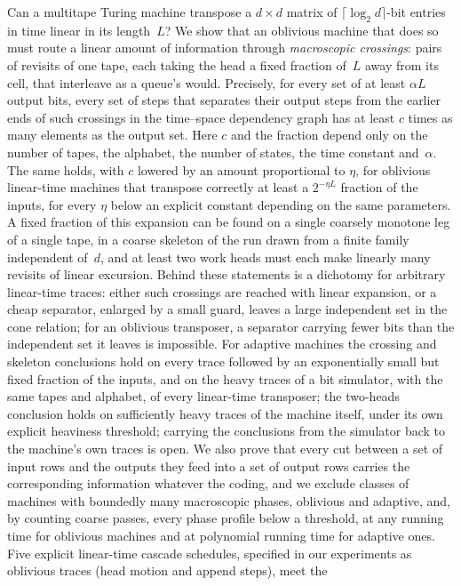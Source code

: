 Can a multitape Turing machine transpose a $d\times d$ matrix of $\lceil\log_2 d\rceil$-bit entries in time linear in its
length~$L$? We show that an oblivious machine that does so must route a linear amount of information through
\emph{macroscopic crossings}: pairs of revisits of one tape, each taking the head a fixed fraction of~$L$ away from its cell,
that interleave as a queue's would. Precisely, for every set of at least $\alpha L$ output bits, every set of steps that separates
their output steps from the earlier ends of such crossings in the time--space dependency graph has at least $c$ times as many
elements as the output set. Here $c$ and the fraction depend only on the number of tapes, the alphabet, the number of states, the
time constant and~$\alpha$. The same holds, with $c$ lowered by an amount proportional to $\eta$, for oblivious linear-time machines
that transpose correctly at least a $2^{-\eta L}$ fraction of the inputs, for every $\eta$ below an explicit constant depending on the
same parameters. A fixed fraction of this expansion can be found on a single coarsely monotone leg of a single tape, in a coarse skeleton of the
run drawn from a finite family independent of~$d$, and at least two work heads must each make linearly many revisits of linear excursion. Behind these
statements is a dichotomy for arbitrary linear-time traces: either such crossings are reached with linear expansion, or a cheap
separator, enlarged by a small guard, leaves a large independent set in the cone relation; for an oblivious transposer, a separator
carrying fewer bits than the independent set it leaves is impossible. For adaptive machines the
crossing and skeleton conclusions hold on every trace followed by an exponentially small but fixed fraction of the inputs, and on the
heavy traces of a bit simulator, with the same tapes and alphabet, of every linear-time transposer; the two-heads conclusion holds on
sufficiently heavy traces of the machine itself, under its own explicit heaviness threshold; carrying the conclusions from the simulator back to the machine's own traces is open.
We also prove that every cut between a set of input rows and the outputs they feed into a set of output rows carries the corresponding
information whatever the coding, and we exclude classes of machines with boundedly many macroscopic phases, oblivious and adaptive, and, by counting coarse
passes, every phase profile below a threshold, at any running time for oblivious machines and at polynomial running time for adaptive
ones.
Five explicit linear-time cascade schedules, specified in our experiments as oblivious traces (head motion and append steps), meet the
